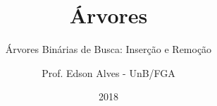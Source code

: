 \title{Árvores}
\subtitle{Árvores Binárias de Busca: Inserção e Remoção}
\author{Prof. Edson Alves - UnB/FGA}
\date{2018}
